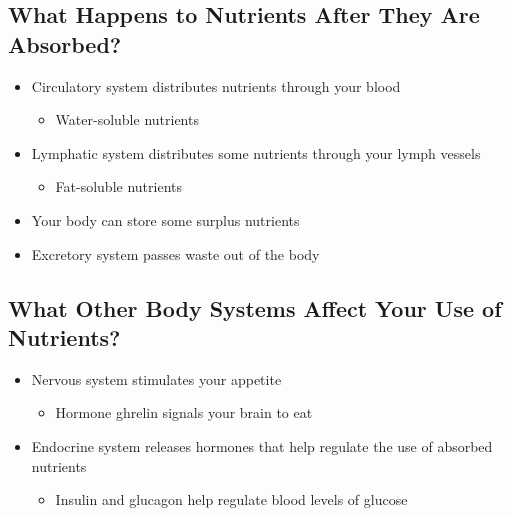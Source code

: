 \documentclass[12pt]{article}
\begin{document}
        \subsection{What Happens to Nutrients After They Are Absorbed?}
            \begin{itemize}
                \item Circulatory system distributes nutrients through your blood
                    \begin{itemize}
                        \item Water-soluble nutrients
                    \end{itemize}
                \item Lymphatic system distributes some nutrients through your lymph vessels
                    \begin{itemize}
                        \item Fat-soluble nutrients
                    \end{itemize}
                \item Your body can store some surplus nutrients
                \item Excretory system passes waste out of the body
            \end{itemize}
    
        \subsection{What Other Body Systems Affect Your Use of Nutrients?}
            \begin{itemize}
                \item Nervous system stimulates your appetite
                    \begin{itemize}
                        \item Hormone ghrelin signals your brain to eat
                    \end{itemize}
                \item Endocrine system releases hormones that help regulate the use of absorbed nutrients
                    \begin{itemize}
                        \item Insulin and glucagon help regulate blood levels of glucose
                    \end{itemize}
            \end{itemize}
\end{document}
